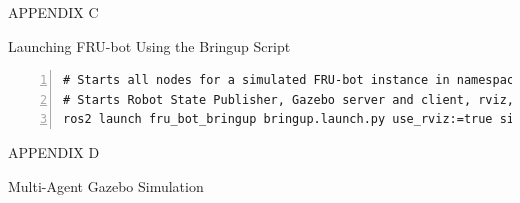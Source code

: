 \documentclass[conference]{IEEEtran}
\begin{document}
\begin{center}APPENDIX C
\end{center}
\begin{center}Launching FRU-bot Using the Bringup Script
\end{center}
\begin{lstlisting}[frame=leftline, breaklines=true, numbers=left, stepnumber=1, numbersep=5pt]
# Starts all nodes for a simulated FRU-bot instance in namespace 'FRU_bot0' with remappings of state publisher (set sim:=false for physical robot).
# Starts Robot State Publisher, Gazebo server and client, rviz, and robot localization toolbox nodes.
ros2 launch fru_bot_bringup bringup.launch.py use_rviz:=true sim:=True use_ns:=True idx:=0 remap_tf:=True
\end{lstlisting}

\begin{center}APPENDIX D
\end{center}
\begin{center}Multi-Agent Gazebo Simulation
\end{center}
\end{document}
